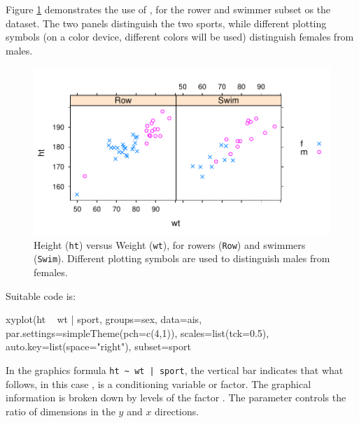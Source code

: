 Figure \ref{fig:lattice-ais} demonstrates the use of ,
for the rower and swimmer subset os the  dataset.  The two
panels distinguish the two sports, while different plotting symbols
(on a color device, different colors will be used) distinguish females
from males.
\begin{figure}[h]
\begin{Schunk}


\centerline{\includegraphics[width=\textwidth]{figs/07-rowSwim-1} }

\end{Schunk}
      \caption{Height (\texttt{ht}) versus Weight (\texttt{wt}), for
        rowers (\texttt{Row}) and swimmers (\texttt{Swim}).
        Different plotting symbols are used to distinguish males from
        females.}\label{fig:lattice-ais}
\end{figure}

\noindent
Suitable code is:
\begin{Schunk}
\begin{Sinput}
xyplot(ht ~ wt | sport, groups=sex, data=ais,
       par.settings=simpleTheme(pch=c(4,1)),
       scales=list(tck=0.5),
       auto.key=list(space="right"),
       subset=sport%
\end{Sinput}
\end{Schunk}

In the graphics formula \verb!ht ~ wt | sport!, 
the vertical bar indicates that what follows, in this case
, is a conditioning variable or factor.  The
graphical information is broken down by levels of the factor
.  The parameter  controls the ratio
of dimensions in the $y$ and $x$ directions.

